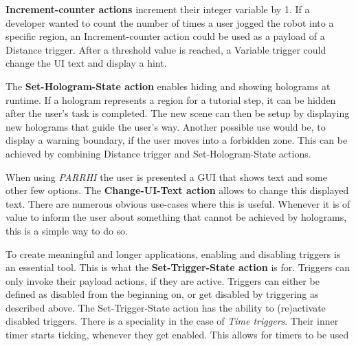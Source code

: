 \textbf{Increment-counter actions} increment their integer variable by 1. If a developer wanted to count the number of times a user jogged the robot into a specific region, an Increment-counter action could be used as a payload of a Distance trigger. After a threshold value is reached, a Variable trigger could change the UI text and display a hint.

The \textbf{Set-Hologram-State action} enables hiding and showing holograms at runtime. If a hologram represents a region for a tutorial step, it can be hidden after the user's task is completed. The new scene can then be setup by displaying new holograms that guide the user's way. Another possible use would be, to display a warning boundary, if the user moves into a forbidden zone. This can be achieved by combining Distance trigger and Set-Hologram-State actions.

When using \textit{PARRHI} the user is presented a GUI that shows text and some other few options. The \textbf{Change-UI-Text action} allows to change this displayed text. There are numerous obvious use-cases where this is useful. Whenever it is of value to inform the user about something that cannot be achieved by holograms, this is a simple way to do so.

To create meaningful and longer applications, enabling and disabling triggers is an essential tool. This is what the \textbf{Set-Trigger-State action} is for. Triggers can only invoke their payload actions, if they are active. Triggers can either be defined as disabled from the beginning on, or get disabled by triggering as described above. The Set-Trigger-State action has the ability to (re)activate disabled triggers. There is a speciality in the case of \textit{Time triggers}. Their inner timer starts ticking, whenever they get enabled. This allows for timers to be used   

























